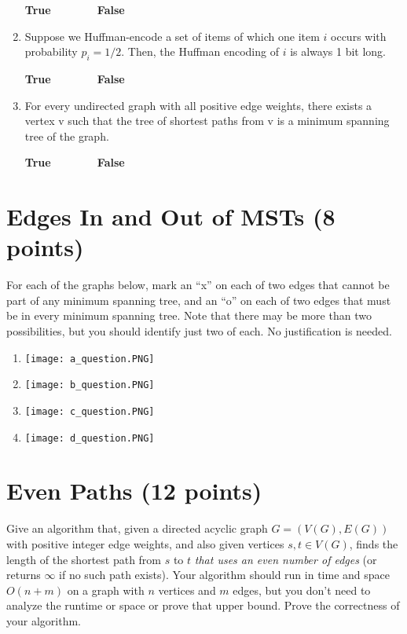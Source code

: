 \documentclass[11pt]{article}
\begin{document}
\begin{enumerate}
    \textbf{True \, \, \, \, \, \, \, False}
\item
Suppose we Huffman-encode a set of items of which one item $i$ occurs with probability $p_i = 1/2$. Then, the Huffman encoding of $i$ is always 1 bit long.
    \medskip 
    
    \textbf{True \, \, \, \, \, \, \, False}
\item

For every undirected graph with all positive edge weights, there exists a vertex v such
that the tree of shortest paths from v is a minimum spanning tree of the graph.
    \medskip 
    
    \textbf{True \, \, \, \, \, \, \, False}
    \end{enumerate}

\newpage

\section{Edges In and Out of MSTs (8 points)}

For each of the graphs below, mark an ``x'' on each of two edges that cannot be part of any minimum spanning tree,
and an ``o'' on each of two edges that must be in every minimum spanning tree. Note that there may be more than two
possibilities, but you should identify just two of each. No justification is needed.

\begin{enumerate}
    \item \texttt{[image: a\_question.PNG]}
        
    \item \texttt{[image: b\_question.PNG]}
    
    \item \texttt{[image: c\_question.PNG]}
        
    \item \texttt{[image: d\_question.PNG]}
    
\end{enumerate}

\newpage

\section{Even Paths (12 points)}
Give an algorithm that, given a directed acyclic graph $G = (V(G), E(G))$ with positive integer edge weights, and also given vertices $s, t \in V(G)$, finds the length of the shortest path from $s$ to $t$ \emph{that uses an even number of edges} (or returns $\infty$ if no such path exists). Your algorithm should run in time and space $O(n+m)$ on a graph with $n$ vertices and $m$ edges, but you don't need to analyze the runtime or space or prove that upper bound. Prove the correctness of your algorithm. 
\end{document}
